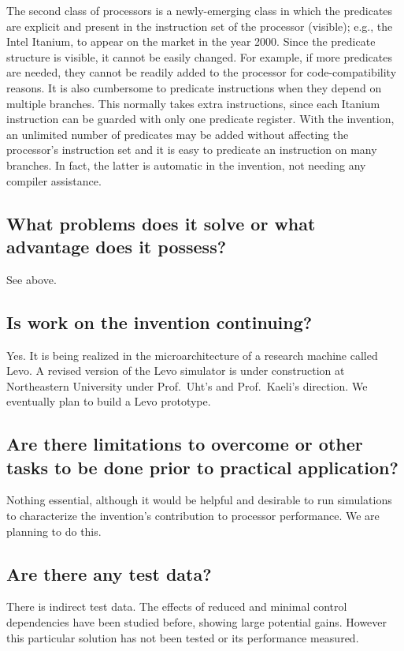 \documentclass[10pt,dvips]{article}
\begin{document}
The second class of processors is a newly-emerging class in which the predicates
are explicit and present in the instruction set of the processor (visible); e.g., the
Intel Itanium, to appear on the market
in the year 2000. Since the predicate structure
is visible, it cannot be easily changed. For example, if more predicates are
needed, they cannot be readily added to the processor for code-compatibility
reasons. It is also cumbersome to predicate instructions when they depend
on multiple branches. This normally takes extra instructions, since each Itanium
instruction can be guarded with only one predicate register.
With the invention, an unlimited number of predicates may be added
without affecting the processor's instruction set and it is easy to
predicate an instruction on many branches. In fact, the latter is automatic
in the invention, not needing any compiler assistance.

\subsection{What problems does it solve or what advantage does it possess?}
See above.

\subsection{Is work on the invention continuing?}
Yes. It is being realized in the microarchitecture of a research machine called Levo.
A revised version of the Levo simulator is under construction at Northeastern
University under Prof.\ Uht's and Prof.\ Kaeli's
direction. We eventually plan to build a Levo prototype.

\subsection{Are there limitations to overcome or other tasks to be done prior to
practical application?}
Nothing essential, although it would be helpful and desirable to run simulations
to characterize the invention's contribution to processor performance. We are
planning to do this.

\subsection{Are there any test data?}
There is indirect test data. The effects of reduced and minimal control dependencies
have been studied before\cite{Uht95,Lam92}, showing large potential gains.
However this particular solution has not been tested or its performance measured.
\end{document}
